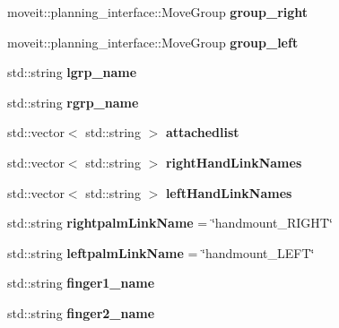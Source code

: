 \begin{DoxyCompactItemize}
\item 
\mbox{\label{classM3MoveGroup_a6915d8381d3f920de1cf8da14570f85d}} 
moveit\+::planning\+\_\+interface\+::\+Move\+Group {\bfseries group\+\_\+right}
\item 
\mbox{\label{classM3MoveGroup_ad2ab3f8321ce20dcf03e56fff4db1fcd}} 
moveit\+::planning\+\_\+interface\+::\+Move\+Group {\bfseries group\+\_\+left}
\item 
\mbox{\label{classM3MoveGroup_a0ea65d533f4ea9d8316fed07fc275f4a}} 
std\+::string {\bfseries lgrp\+\_\+name}
\item 
\mbox{\label{classM3MoveGroup_a85ba7e1cee1212a2f57f1a62b19cca2e}} 
std\+::string {\bfseries rgrp\+\_\+name}
\item 
\mbox{\label{classM3MoveGroup_a3cc83beee6f89f60cc5d2fe15f788ab6}} 
std\+::vector$<$ std\+::string $>$ {\bfseries attachedlist}
\item 
\mbox{\label{classM3MoveGroup_ae72bfc37b9dffd62ef13ddba8a8b9e69}} 
std\+::vector$<$ std\+::string $>$ {\bfseries right\+Hand\+Link\+Names}
\item 
\mbox{\label{classM3MoveGroup_aba01671142feb7c3254d44be29d1127d}} 
std\+::vector$<$ std\+::string $>$ {\bfseries left\+Hand\+Link\+Names}
\item 
\mbox{\label{classM3MoveGroup_af2d7b7e7684185e9610705b48abd9ce2}} 
std\+::string {\bfseries rightpalm\+Link\+Name} = \char`\"{}handmount\+\_\+\+R\+I\+G\+HT\char`\"{}
\item 
\mbox{\label{classM3MoveGroup_a2ac2ba2389c7790242dd3dbeadbb2838}} 
std\+::string {\bfseries leftpalm\+Link\+Name} = \char`\"{}handmount\+\_\+\+L\+E\+FT\char`\"{}
\item 
\mbox{\label{classM3MoveGroup_aaa009ee7cda688cef56adfc4f9af01b8}} 
std\+::string {\bfseries finger1\+\_\+name}
\item 
\mbox{\label{classM3MoveGroup_a8b0db8435a640b34e10e82e56bc5bfb4}} 
std\+::string {\bfseries finger2\+\_\+name}
\end{DoxyCompactItemize}



